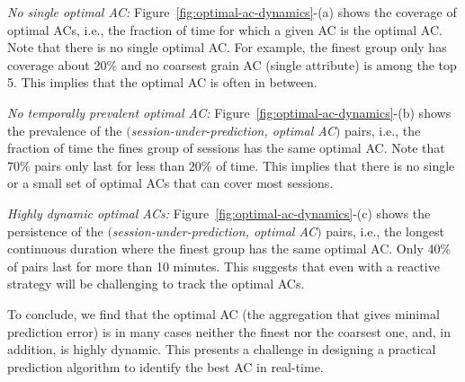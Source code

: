 
\begin{packeditemize}
	\item {\it No single optimal AC:} Figure~\ref{fig:optimal-ac-dynamics}-(a) shows the coverage of optimal ACs, i.e., the fraction of time for which a given AC is the optimal AC. Note that there is no single optimal AC. For example, the finest group only has coverage about 20\% and no coarsest grain AC (single attribute) is among the top 5. This implies that the optimal AC is often in between.
	\item {\it No temporally prevalent optimal AC:} Figure~\ref{fig:optimal-ac-dynamics}-(b) shows the prevalence of the $($\emph{session-under-prediction, optimal AC}$)$ pairs, i.e., the fraction of time the fines group of sessions has the same optimal AC. Note that $70\%$ pairs only last for less than $20\%$ of time. This implies that there is no single or a small set of optimal ACs that can cover most sessions.
	\item {\it Highly dynamic optimal ACs:} Figure~\ref{fig:optimal-ac-dynamics}-(c) shows the persistence of the $($\emph{session-under-prediction, optimal AC}$)$ pairs, i.e., the longest continuous duration where the finest group has the same optimal AC. Only 40\% of pairs last for more than 10 minutes. This suggests that even with a reactive strategy will be challenging to track the optimal ACs.
\end{packeditemize}

To conclude, we find that the optimal AC (the aggregation that gives minimal prediction error) is in many cases neither the finest nor the coarsest one, and, in addition, is highly dynamic. This presents a challenge in designing a practical prediction algorithm to identify the best AC in real-time.


